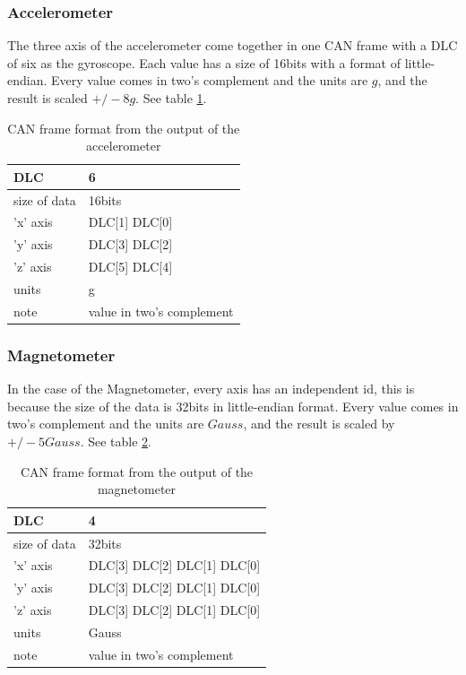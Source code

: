 \documentclass[12pt]{report}%
\begin{document}
\subsubsection{Accelerometer}
The three axis of the accelerometer come together in one CAN frame with a DLC of six as the gyroscope. Each value has a size of 16bits with a format of little-endian. Every value comes in two's complement and the units are $g$, and the result is scaled $+/-8g$. See table \ref{tab:accelerometer}.

\begin{table}[h!]
\centering
\begin{tabular}{|l|l|}
	\hline
	DLC						&	6													\\	\hline
	size of data	&	16bits										\\	\hline
	'x' axis			&	DLC[1] DLC[0]							\\	\hline
	'y'	axis			&	DLC[3] DLC[2]							\\	\hline
	'z'	axis			&	DLC[5] DLC[4]							\\	\hline
	units					&	g													\\	\hline
	note					& value in two's complement \\	\hline
\end{tabular}
\caption{\label{tab:accelerometer} CAN frame format from the output of the accelerometer}
\end{table}

\subsubsection{Magnetometer}
In the case of the Magnetometer, every axis has an independent id, this is because the size of the data is 32bits in little-endian format. Every value comes in two's complement and the units are $Gauss$, and the result is scaled by $+/-5Gauss$. See table \ref{tab:magnetometer}.

\begin{table}[h!]
\centering
\begin{tabular}{|l|l|}
	\hline
	DLC						&	4														\\	\hline
	size of data	&	32bits											\\	\hline
	'x' axis			&	DLC[3] DLC[2] DLC[1] DLC[0]	\\	\hline
	'y'	axis			&	DLC[3] DLC[2] DLC[1] DLC[0]	\\	\hline
	'z'	axis			&	DLC[3] DLC[2] DLC[1] DLC[0]	\\	\hline
	units					&	Gauss												\\	\hline
	note					& value in two's complement 	\\	\hline
\end{tabular}
\caption{\label{tab:magnetometer} CAN frame format from the output of the magnetometer}
\end{table}
\end{document}
